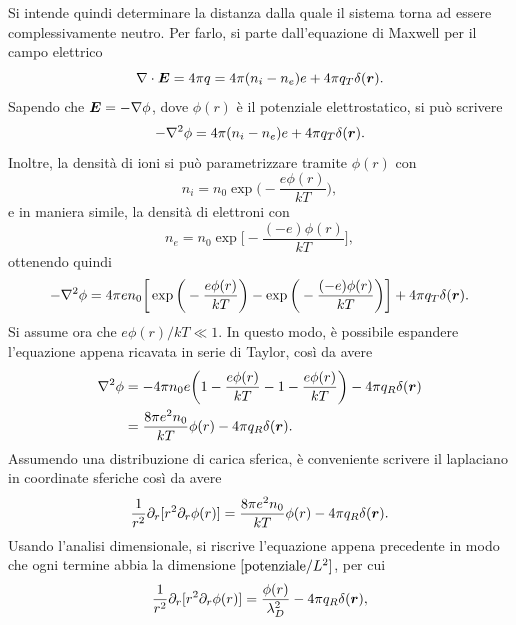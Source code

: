 Si intende quindi determinare la distanza dalla quale il sistema torna ad essere complessivamente neutro. Per farlo, si parte dall'equazione di Maxwell per il campo elettrico
\begin{equation}
    \nabla \cdot \bm{E} = 4\pi q = 4\pi(n_i - n_e)e + 4\pi q_T\delta(\bm{r}).
\end{equation}
Sapendo che $\bm{E} = -\nabla\phi$, dove $\phi(r)$ è il potenziale elettrostatico, si può scrivere
\begin{equation}
    -\nabla^2\phi = 4\pi(n_i - n_e)e + 4\pi q_T\delta(\bm{r}).
\end{equation}
Inoltre, la densità di ioni si può parametrizzare tramite $\phi(r)$ con
\begin{equation}
    n_i = n_0\exp{\bigg(-\frac{e\phi(r)}{kT}\bigg)},
\end{equation}
e in maniera simile, la densità di elettroni con
\begin{equation}
\label{eq: densità di elettroni}
    n_e = n_0\exp{\bigg[-\frac{(-e)\phi(r)}{kT}\bigg]},
\end{equation}
ottenendo quindi
\begin{equation}
    -\nabla^2\phi = 4\pi en_0\bigg[\exp{\bigg(-\frac{e\phi(r)}{kT}\bigg)} - \exp{\bigg(-\frac{(-e)\phi(r)}{kT}\bigg)}\bigg] + 4\pi q_T\delta(\bm{r}).
\end{equation}
Si assume ora che $e\phi(r)/kT \ll 1$. In questo modo, è possibile espandere l'equazione appena ricavata in serie di Taylor, così da avere
\begin{equation}
    \begin{split}
        \nabla^2\phi &= -4\pi n_0e\bigg(1 - \frac{e\phi(r)}{kT} - 1 - \frac{e\phi(r)}{kT}\bigg) - 4\pi q_R\delta(\bm{r}) \\
        &= \frac{8\pi e^2n_0}{kT}\phi(r) - 4\pi q_R\delta(\bm{r}).
    \end{split}
\end{equation}
Assumendo una distribuzione di carica sferica, è conveniente scrivere il laplaciano in coordinate sferiche così da avere
\begin{equation}
    \frac{1}{r^2}\partial_r[r^2\partial_r\phi(r)] = \frac{8\pi e^2n_0}{kT}\phi(r) - 4\pi q_R\delta(\bm{r}).
\end{equation}
Usando l'analisi dimensionale, si riscrive l'equazione appena precedente in modo che ogni termine abbia la dimensione $[\mathrm{potenziale}/L^2]$, per cui 
\begin{equation}
\label{eq: equazione del potenziale elettrostico in coordinate sferiche}
    \frac{1}{r^2}\partial_r[r^2\partial_r\phi(r)] = \frac{\phi(r)}{\lambda_D^2} - 4\pi q_R\delta(\bm{r}),
\end{equation}
